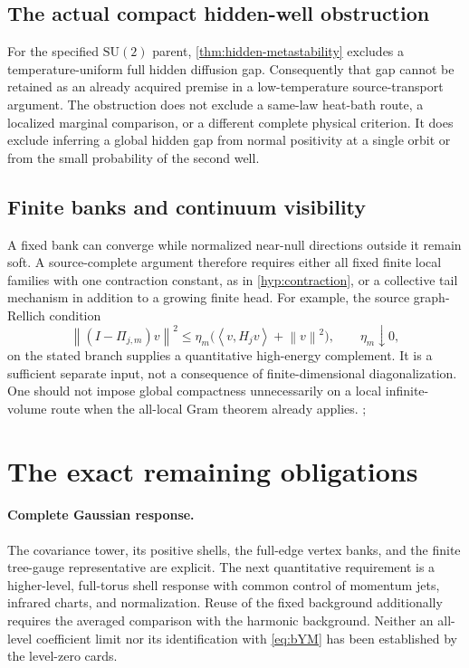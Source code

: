 \documentclass[11pt,oneside,openany]{book}
\theoremstyle{definition}
\theoremstyle{remark}
\newcommand{\SU}{\mathrm{SU}}
\newcommand{\norm}[1]{\left\lVert#1\right\rVert}
\newcommand{\ip}[2]{\left\langle#1,#2\right\rangle}
\newcommand{\src}[2]{\cite[#2]{#1}}
\begin{document}
\subsection{The actual compact hidden-well obstruction}
For the specified $\SU(2)$ parent, \cref{thm:hidden-metastability}
excludes a temperature-uniform full hidden diffusion gap. Consequently
that gap cannot be retained as an already acquired premise in a
low-temperature source-transport argument. The obstruction does not
exclude a same-law heat-bath route, a localized marginal comparison,
or a different complete physical criterion. It does exclude inferring
a global hidden gap from normal positivity at a single orbit or from
the small probability of the second well.

\subsection{Finite banks and continuum visibility}
A fixed bank can converge while normalized near-null directions outside it remain soft. A source-complete argument therefore requires either all fixed finite local families with one contraction constant, as in \cref{hyp:contraction}, or a collective tail mechanism in addition to a growing finite head. For example, the source graph-Rellich condition
\[
\norm{(I-\Pi_{j,m})v}^2
\le\eta_m\bigl(\ip{v}{H_jv}+\norm v^2\bigr),\qquad\eta_m\downarrow0,
\]
on the stated branch supplies a quantitative high-energy complement. It is a sufficient separate input, not a consequence of finite-dimensional diagonalization. One should not impose global compactness unnecessarily on a local infinite-volume route when the all-local Gram theorem already applies. \cite{GT}; \src{F1}{V1--V5}

\section{The exact remaining obligations}
\paragraph{Complete Gaussian response.}
The covariance tower, its positive shells, the full-edge vertex banks, and
the finite tree-gauge representative are explicit. The next quantitative
requirement is a higher-level, full-torus shell response with common
control of momentum jets, infrared charts, and normalization. Reuse of
the fixed background additionally requires the averaged comparison with
the harmonic background. Neither an all-level coefficient limit nor its
identification with \cref{eq:bYM} has been established by the level-zero
cards.
\end{document}
